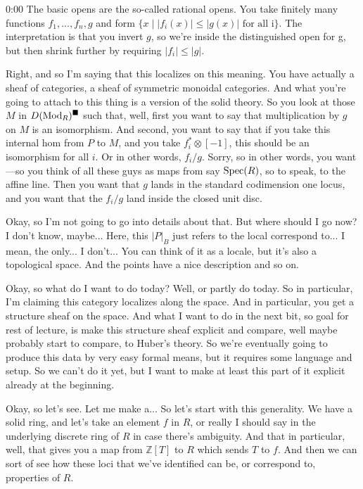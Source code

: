 \begin{unfinished}{0:00}
The basic opens are the so-called rational opens. You take finitely many functions $f_1,...,f_n, g$ and form $\{x \mid |f_i(x)| \le |g(x)|\text { for all i}\}$. The interpretation is that you invert $g$, so we're inside the distinguished open for g, but then shrink further by requiring $|f_i| \le |g|$.

Right, and so I'm saying that this localizes on this meaning. You have actually a sheaf of categories, a sheaf of symmetric monoidal categories. And what you're going to attach to this thing is a version of the solid theory. So you look at those $M$ in $D(\operatorname{Mod}_R)^\blacksquare$ such that, well, first you want to say that multiplication by $g$ on $M$ is an isomorphism. And second, you want to say that if you take this internal hom from $P$ to $M$, and you take $f_i^* \otimes [-1]$, this should be an isomorphism for all $i$. Or in other words, $f_i/g$. Sorry, so in other words, you want---so you think of all these guys as maps from say $\operatorname{Spec}(R)$, so to speak, to the affine line. Then you want that $g$ lands in the standard codimension one locus, and you want that the $f_i/g$ land inside the closed unit disc.

Okay, so I'm not going to go into details about that. But where should I go now? I don't know, maybe... Here, this $|P|_B$ just refers to the local correspond to... I mean, the only... I don't... You can think of it as a locale, but it's also a topological space. And the points have a nice description and so on.

Okay, so what do I want to do today? Well, or partly do today. So in particular, I'm claiming this category localizes along the space. And in particular, you get a structure sheaf on the space. And what I want to do in the next bit, so goal for rest of lecture, is make this structure sheaf explicit and compare, well maybe probably start to compare, to Huber's theory. So we're eventually going to produce this data by very easy formal means, but it requires some language and setup. So we can't do it yet, but I want to make at least this part of it explicit already at the beginning.

Okay, so let's see. Let me make a... So let's start with this generality. We have a solid ring, and let's take an element $f$ in $R$, or really I should say in the underlying discrete ring of $R$ in case there's ambiguity. And that in particular, well, that gives you a map from $\mathbb{Z}[T]$ to $R$ which sends $T$ to $f$. And then we can sort of see how these loci that we've identified can be, or correspond to, properties of $R$.


\end{unfinished}
